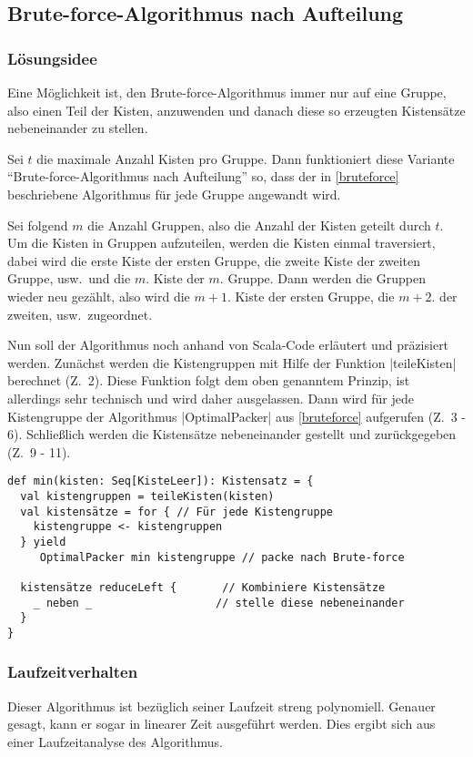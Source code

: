 \subsection{Brute-force-Algorithmus nach Aufteilung}
\label{auf}
\subsubsection{Lösungsidee}
 Eine Möglichkeit ist, den Brute-force-Algorithmus immer nur auf eine Gruppe,
  also einen Teil der Kisten, anzuwenden und danach diese so erzeugten Kistensätze nebeneinander zu stellen.
 
 Sei $t$ die maximale Anzahl Kisten pro Gruppe.
 Dann funktioniert diese Variante ``Brute-force-Algorithmus nach Aufteilung'' so,
 dass der in \ref{bruteforce} beschriebene Algorithmus für jede Gruppe angewandt wird.

 Sei folgend $m$ die Anzahl Gruppen, also die Anzahl der Kisten geteilt durch $t$.
 Um die Kisten in Gruppen aufzuteilen, werden die Kisten einmal traversiert,
 dabei wird die erste Kiste der ersten Gruppe, die zweite Kiste der zweiten Gruppe, usw.\ und die $m.$ Kiste der $m.$ Gruppe.
 Dann werden die Gruppen wieder neu gezählt, also wird die $m+1.$ Kiste der ersten Gruppe, die $m+2.$ der zweiten, usw.\ zugeordnet.

 Nun soll der Algorithmus noch anhand von Scala-Code erläutert und präzisiert werden.
 Zunächst werden die Kistengruppen mit Hilfe der Funktion |teileKisten| berechnet (Z.\ 2).
 Diese Funktion folgt dem oben genanntem Prinzip, ist allerdings sehr technisch und wird daher ausgelassen.
 Dann wird für jede Kistengruppe der Algorithmus |OptimalPacker| aus \ref{bruteforce} aufgerufen (Z.\ 3 - 6).
 Schließlich werden die Kistensätze nebeneinander gestellt und zurückgegeben (Z.\ 9 - 11).
\begin{lstlisting}
def min(kisten: Seq[KisteLeer]): Kistensatz = {
  val kistengruppen = teileKisten(kisten)
  val kistensätze = for { // Für jede Kistengruppe
    kistengruppe <- kistengruppen
  } yield
     OptimalPacker min kistengruppe // packe nach Brute-force
  
  kistensätze reduceLeft {       // Kombiniere Kistensätze
    _ neben _                   // stelle diese nebeneinander
  }
}
\end{lstlisting}

\subsubsection{Laufzeitverhalten}
 Dieser Algorithmus ist bezüglich seiner Laufzeit streng polynomiell. Genauer gesagt, kann er sogar in linearer Zeit ausgeführt werden.
 Dies ergibt sich aus einer Laufzeitanalyse des Algorithmus.


